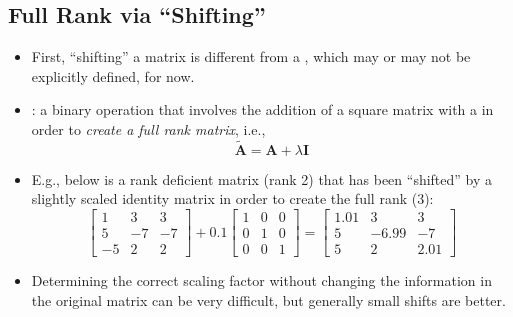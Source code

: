 \begin{itemize}
  \subsection{Full Rank via ``Shifting''}\label{Full Rank via ``Shifting''}
  \begin{itemize}
    \item First, ``shifting'' a matrix is different from a \hyperref[tbd]{}, which may or may not be explicitly defined, for now. 
    \item {} : a binary operation that involves the addition of a square matrix with a \hyperref[Diagonal and Triagnular Matrices]{} in order to \emph{create a full rank matrix}, i.e.,
    \[%
    \tilde{\bm{A}}=\bm{A}+\lambda \bm{I}
    \]%
    \item E.g., below is a rank deficient matrix (rank 2) that has been ``shifted'' by a slightly scaled identity matrix in order to create the full rank (3):
    \[%
    \begin{bmatrix}
      1 & 3 & 3 \\
      5 & -7 & -7  \\
      -5 & 2  & 2 
    \end{bmatrix} +
    0.1 
    \begin{bmatrix}
      1 & 0 & 0 \\
      0 & 1 & 0 \\
      0 & 0 & 1 
    \end{bmatrix} =
    \begin{bmatrix}
      1.01 & 3 & 3 \\
      5 & -6.99 & -7  \\
      5 & 2  & 2.01 
    \end{bmatrix}
    \]%
    \item Determining the correct scaling factor without changing the information in the original matrix can be very difficult, but generally small shifts are better. 
  \end{itemize}
\end{itemize}
  


